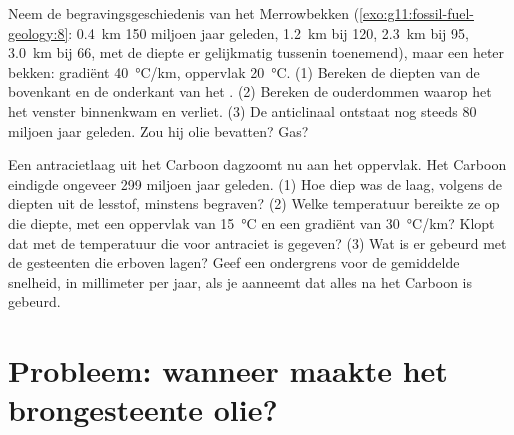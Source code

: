 \begin{exercise}[$\star\star\star$]\label{exo:g11:fossil-fuel-geology:14}
Neem de begravingsgeschiedenis van het Merrowbekken (\cref{exo:g11:fossil-fuel-geology:8}:
\qty{0.4}{km} 150 miljoen jaar geleden, \qty{1.2}{km} bij 120, \qty{2.3}{km}
bij 95, \qty{3.0}{km} bij 66, met de diepte er gelijkmatig tussenin toenemend), maar een
heter bekken: gradiënt \qty{40}{\degreeCelsius/km}, oppervlak
\qty{20}{\degreeCelsius}. (1) Bereken de diepten van de bovenkant en de onderkant van
het . (2) Bereken de ouderdommen waarop het  het venster
binnenkwam en verliet. (3) De anticlinaal ontstaat nog steeds 80 miljoen jaar geleden. Zou
hij olie bevatten? Gas?
\end{exercise}

\begin{exercise}[$\star\star\star$]\label{exo:g11:fossil-fuel-geology:15}
Een antracietlaag uit het Carboon dagzoomt nu aan het oppervlak. Het
Carboon eindigde ongeveer 299 miljoen jaar geleden. (1) Hoe diep was de laag, volgens de
diepten uit de lesstof, minstens begraven? (2) Welke temperatuur bereikte ze op die diepte, met een oppervlak van
\qty{15}{\degreeCelsius} en een gradiënt van \qty{30}{\degreeCelsius/km}? Klopt dat met de
temperatuur die voor antraciet is gegeven? (3) Wat is er gebeurd met de gesteenten die
erboven lagen? Geef een ondergrens voor de gemiddelde snelheid, in millimeter per
jaar, als je aanneemt dat alles na het Carboon is gebeurd.
\end{exercise}

\section{Probleem: wanneer maakte het brongesteente olie?}

